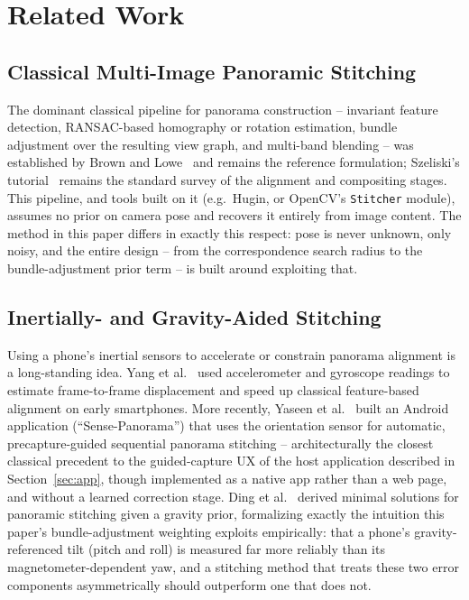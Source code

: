 \documentclass[11pt]{article}
\begin{document}
\section{Related Work}
\label{sec:related}

\subsection{Classical Multi-Image Panoramic Stitching}

The dominant classical pipeline for panorama construction -- invariant feature detection, RANSAC-based homography or rotation estimation, bundle adjustment over the resulting view graph, and multi-band blending -- was established by Brown and Lowe~\cite{brown2007automatic} and remains the reference formulation; Szeliski's tutorial~\cite{szeliski2006alignment} remains the standard survey of the alignment and compositing stages. This pipeline, and tools built on it (e.g.\ Hugin, or OpenCV's \texttt{Stitcher} module), assumes no prior on camera pose and recovers it entirely from image content. The method in this paper differs in exactly this respect: pose is never unknown, only noisy, and the entire design -- from the correspondence search radius to the bundle-adjustment prior term -- is built around exploiting that.

\subsection{Inertially- and Gravity-Aided Stitching}

Using a phone's inertial sensors to accelerate or constrain panorama alignment is a long-standing idea. Yang et al.~\cite{yang2011inertial} used accelerometer and gyroscope readings to estimate frame-to-frame displacement and speed up classical feature-based alignment on early smartphones. More recently, Yaseen et al.~\cite{yaseen2023sensepanorama} built an Android application (``Sense-Panorama'') that uses the orientation sensor for automatic, precapture-guided sequential panorama stitching -- architecturally the closest classical precedent to the guided-capture UX of the host application described in Section~\ref{sec:app}, though implemented as a native app rather than a web page, and without a learned correction stage. Ding et al.~\cite{ding2021gravity} derived minimal solutions for panoramic stitching given a gravity prior, formalizing exactly the intuition this paper's bundle-adjustment weighting exploits empirically: that a phone's gravity-referenced tilt (pitch and roll) is measured far more reliably than its magnetometer-dependent yaw, and a stitching method that treats these two error components asymmetrically should outperform one that does not.
\end{document}
